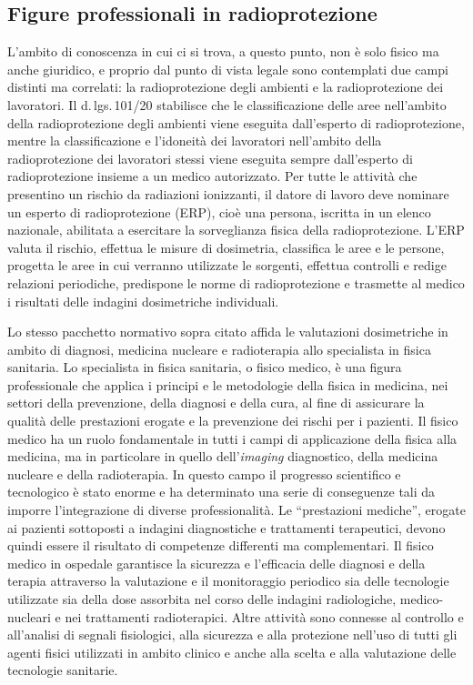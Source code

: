 \documentclass{report}
\newcommand{\virgolette}[1]{``#1''}
\numberwithin{equation}{section}
\numberwithin{figure}{section}
\begin{document}
\subsection{Figure professionali in radioprotezione}
L'ambito di conoscenza in cui ci si trova, a questo punto, non è solo fisico ma anche giuridico, e proprio dal punto di vista legale sono contemplati due campi distinti ma correlati: la radioprotezione degli ambienti e la radioprotezione dei lavoratori. Il d.\,lgs.\,101/20 stabilisce che le classificazione delle aree nell'ambito della radioprotezione degli ambienti viene eseguita dall'esperto di radioprotezione, mentre la classificazione e l'idoneità dei lavoratori nell'ambito della radioprotezione dei lavoratori stessi viene eseguita sempre dall'esperto di radioprotezione insieme a un medico autorizzato. Per tutte le attività che presentino un rischio da radiazioni ionizzanti, il datore di lavoro deve nominare un esperto di radioprotezione (ERP), cioè una persona, iscritta in un elenco nazionale, abilitata a esercitare la sorveglianza fisica della radioprotezione. L'ERP valuta il rischio, effettua le misure di dosimetria, classifica le aree e le persone, progetta le aree in cui verranno utilizzate le sorgenti, effettua controlli e redige relazioni periodiche, predispone le norme di radioprotezione e trasmette al medico i risultati delle indagini dosimetriche individuali.

Lo stesso pacchetto normativo sopra citato affida le valutazioni dosimetriche in ambito di diagnosi, medicina nucleare e radioterapia allo specialista in fisica sanitaria. Lo specialista in fisica sanitaria, o fisico medico, è una figura professionale che applica i principi e le metodologie della fisica in medicina, nei settori della prevenzione, della diagnosi e della cura, al fine di assicurare la qualità delle prestazioni erogate e la prevenzione dei rischi per i pazienti. Il fisico medico ha un ruolo fondamentale in tutti i campi di applicazione della fisica alla medicina, ma in particolare in quello dell'\textit{imaging} diagnostico, della medicina nucleare e della radioterapia. In questo campo il progresso scientifico e tecnologico è stato enorme e ha determinato una serie di conseguenze tali da imporre l'integrazione di diverse professionalità. Le \virgolette{prestazioni mediche}, erogate ai pazienti sottoposti a indagini diagnostiche e trattamenti terapeutici, devono quindi essere il risultato di competenze differenti ma complementari. Il fisico medico in ospedale garantisce la sicurezza e l'efficacia delle diagnosi e della terapia attraverso la valutazione e il monitoraggio periodico sia delle tecnologie utilizzate sia della dose assorbita nel corso delle indagini radiologiche, medico-nucleari e nei trattamenti radioterapici. Altre attività sono connesse al controllo e all'analisi di segnali fisiologici, alla sicurezza e alla protezione nell'uso di tutti gli agenti fisici utilizzati in ambito clinico e anche alla scelta e alla valutazione delle tecnologie sanitarie.
\end{document}
